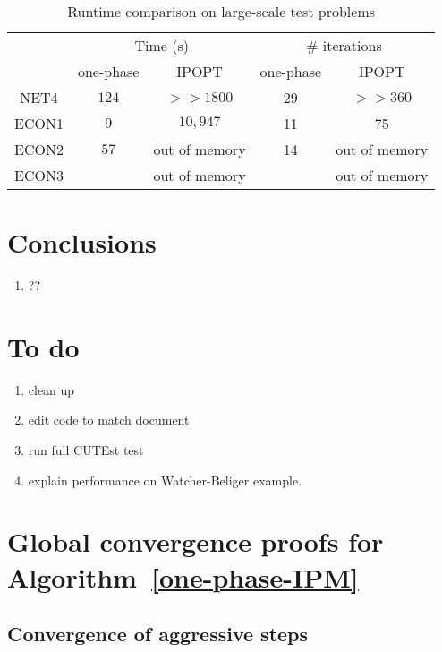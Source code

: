 \documentclass{article}
\begin{document}
\begin{table}[H]
\begin{tabular}{|c| c c | c c |}
  \hline
  \multirow{2}{*}{} 
      & \multicolumn{2}{c|}{Time (s)} 
          & \multicolumn{2}{|c|}{\# iterations} \\             \cline{2-5}
  & one-phase & IPOPT & one-phase & IPOPT \\  \hline
  NET4 & $124$ & $>> 1800$  & 29   & $>> 360$ \\      \hline
  ECON1 & $9$  & $10,947$  & 11 & 75  \\      \hline
  ECON2 & $57$  &  out of memory & 14 & out of memory \\      \hline
  ECON3 &  &out of memory & & out of memory \\      \hline
\end{tabular}
\caption{Runtime comparison on large-scale test problems}\label{compare-runtime}
\end{table}


\section{Conclusions}
\begin{enumerate}
\item ??
\end{enumerate}


\section{To do}

\begin{enumerate}
\item clean up 
\item edit code to match document
\item run full CUTEst test
\item explain performance on Watcher-Beliger example.
\end{enumerate}




\appendix

\section{Global convergence proofs for Algorithm~\ref{one-phase-IPM}}\label{app:global-conv}

\subsection{Convergence of aggressive steps}
\end{document}
